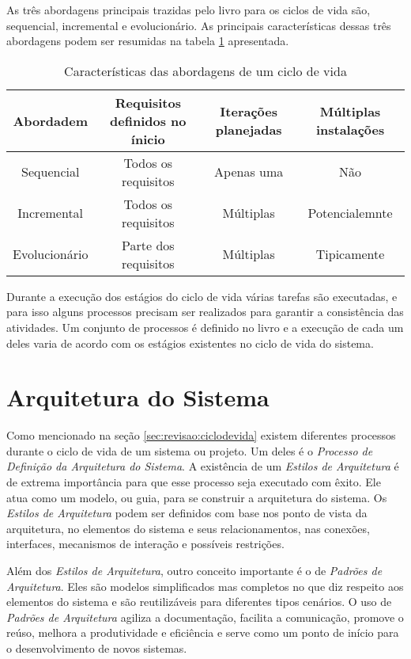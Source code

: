 	As três abordagens principais trazidas pelo livro para os ciclos de vida são, sequencial, incremental e evolucionário. As principais características dessas três abordagens
	podem ser resumidas na tabela \ref{tab:revisao:ciclodevida:abordagens} apresentada.

	\begin{table}[!h]
		\centering
		\caption{Características das abordagens de um ciclo de vida}
		\begin{tabular}{cccc}
			\hline
			Abordadem & Requisitos definidos no ínicio & Iterações planejadas & Múltiplas instalações \\
			\hline
			Sequencial & Todos os requisitos & Apenas uma & Não\\
			Incremental & Todos os requisitos & Múltiplas & Potencialemnte\\
			Evolucionário & Parte dos requisitos & Múltiplas & Tipicamente\\
			\hline
		\end{tabular}
		\label{tab:revisao:ciclodevida:abordagens}
	\end{table}

	Durante a execução dos estágios do ciclo de vida várias tarefas são executadas, e para isso alguns processos precisam ser realizados para garantir a consistência das atividades. Um conjunto
	de processos é definido no livro e a execução de cada um deles varia de acordo com os estágios existentes no ciclo de vida do sistema.
	
\section{Arquitetura do Sistema}\label{sec:revisao:arqSistema}

	Como mencionado na seção \ref{sec:revisao:ciclodevida} existem diferentes processos durante o ciclo de vida de um sistema ou projeto. Um deles é o 
	\textit{Processo de Definição da Arquitetura do Sistema}. A existência de um  \textit{Estilos de Arquitetura} é de extrema importância para que esse processo seja executado com êxito. Ele
	atua como um modelo, ou guia, para se construir a arquitetura do sistema. Os \textit{Estilos de Arquitetura} podem ser definidos com base nos ponto de vista da arquitetura, no elementos do
	sistema e seus relacionamentos, nas conexões, interfaces, mecanismos de interação e possíveis restrições.
	
	Além dos \textit{Estilos de Arquitetura}, outro conceito importante é o de \textit{Padrões de Arquitetura}. Eles são modelos simplificados mas completos no que diz respeito aos elementos do
	sistema e são reutilizáveis para diferentes tipos cenários. O uso de \textit{Padrões de Arquitetura} agiliza  a documentação, facilita a comunicação, promove o reúso, melhora a produtividade
	e eficiência e serve como um ponto de início para o desenvolvimento de novos sistemas.


